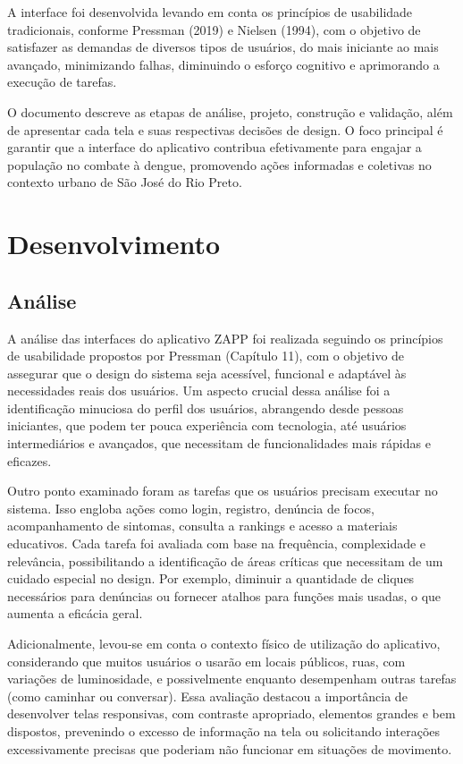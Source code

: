 \documentclass[a4paper, 12pt]{article}
\begin{document}
 A interface foi desenvolvida levando em conta os princípios de usabilidade tradicionais, conforme Pressman (2019) e Nielsen (1994), com o objetivo de satisfazer as demandas de diversos tipos de usuários, do mais iniciante ao mais avançado, minimizando falhas, diminuindo o esforço cognitivo e aprimorando a execução de tarefas. 
 
O documento descreve as etapas de análise, projeto, construção e validação, além de apresentar cada tela e suas respectivas decisões de design. O foco principal é garantir que a interface do aplicativo contribua efetivamente para engajar a população no combate à dengue, promovendo ações informadas e coletivas no contexto urbano de São José do Rio Preto.

\newpage
\section{Desenvolvimento}

\subsection{Análise}
A análise das interfaces do aplicativo ZAPP foi realizada seguindo os princípios de usabilidade propostos por Pressman (Capítulo 11), com o objetivo de assegurar que o design do sistema seja acessível, funcional e adaptável às necessidades reais dos usuários. Um aspecto crucial dessa análise foi a identificação minuciosa do perfil dos usuários, abrangendo desde pessoas iniciantes, que podem ter pouca experiência com tecnologia, até usuários intermediários e avançados, que necessitam de funcionalidades mais rápidas e eficazes.

Outro ponto examinado foram as tarefas que os usuários precisam executar no sistema. Isso engloba ações como login, registro, denúncia de focos, acompanhamento de sintomas, consulta a rankings e acesso a materiais educativos. Cada tarefa foi avaliada com base na frequência, complexidade e relevância, possibilitando a identificação de áreas críticas que necessitam de um cuidado especial no design. Por exemplo, diminuir a quantidade de cliques necessários para denúncias ou fornecer atalhos para funções mais usadas, o que aumenta a eficácia geral.

Adicionalmente, levou-se em conta o contexto físico de utilização do aplicativo, considerando que muitos usuários o usarão em locais públicos, ruas, com variações de luminosidade, e possivelmente enquanto desempenham outras tarefas (como caminhar ou conversar). Essa avaliação destacou a importância de desenvolver telas responsivas, com contraste apropriado, elementos grandes e bem dispostos, prevenindo o excesso de informação na tela ou solicitando interações excessivamente precisas que poderiam não funcionar em situações de movimento.
\end{document}

